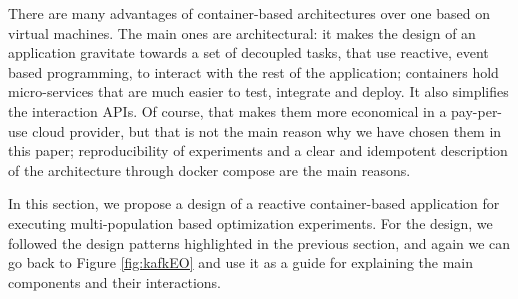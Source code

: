 \documentclass[review]{elsarticle}
\begin{document}
There are many advantages of container-based architectures over one
based on virtual machines. The main ones are architectural: it makes
the design of an application gravitate towards a set of decoupled
tasks, that use reactive, event based programming, to interact with
the rest of the application; containers hold micro-services that are
much easier to test, integrate and deploy. It also simplifies
the interaction APIs. Of course, that makes them more economical in a
pay-per-use cloud provider, but that is not the main reason why we
have chosen them in this paper; reproducibility of experiments and a
clear and idempotent description of the architecture through docker
compose are the main reasons. 

In this section, we propose a design of a reactive container-based application
for executing multi-population based optimization experiments.  For the design,
we followed the design patterns highlighted in the previous section, and again
we can go back to Figure \ref{fig:kafkEO} and use it as a guide for explaining
the main components and their interactions. 



 
\end{document}
